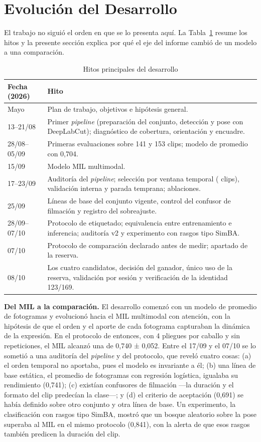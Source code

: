 \section{Evolución del Desarrollo}
El trabajo no siguió el orden en que se lo presenta aquí. La Tabla~\ref{tab:c4-hitos} resume los hitos y la presente sección explica por qué el eje del informe cambió de un modelo a una comparación.

\begin{table}[H]
\caption{Hitos principales del desarrollo}\label{tab:c4-hitos}
{\singlespacing\small
\begin{tabularx}{\textwidth}{@{}p{2.6cm}X@{}}
\toprule
Fecha (2026) & Hito \\
\midrule
Mayo & Plan de trabajo, objetivos e hipótesis general. \\
13--21/08 & Primer \textit{pipeline} (preparación del conjunto, detección y pose con DeepLabCut); diagnóstico de cobertura, orientación y encuadre. \\
28/08--05/09 & Primeras evaluaciones sobre 141 y 153 clips; modelo de promedio con \fmacro{} 0,704. \\
15/09 & Modelo MIL multimodal. \\
17--23/09 & Auditoría del \textit{pipeline}; selección por ventana temporal (\ClipsTotal{} clips), validación interna y parada temprana; ablaciones. \\
25/09 & Líneas de base del conjunto vigente, control del confusor de filmación y registro del sobreajuste. \\
28/09--07/10 & Protocolo de etiquetado; equivalencia entre entrenamiento e inferencia; auditoría v2 y experimento con rasgos tipo SimBA. \\
07/10 & Protocolo de comparación declarado antes de medir; apartado de la reserva. \\
08/10 & Los cuatro candidatos, decisión del ganador, único uso de la reserva, validación por sesión y verificación de la identidad 123/169. \\
\bottomrule
\end{tabularx}}
\end{table}

\textbf{Del MIL a la comparación.} El desarrollo comenzó con un modelo de promedio de fotogramas y evolucionó hacia el MIL multimodal con atención, con la hipótesis de que el orden y el aporte de cada fotograma capturaban la dinámica de la expresión. En el protocolo de entonces, con 4 pliegues por caballo y sin repeticiones, el MIL alcanzó una \fmacro{} de 0,740 ± 0,052. Entre el 17/09 y el 07/10 se lo sometió a una auditoría del \textit{pipeline} y del protocolo, que reveló cuatro cosas: (a) el orden temporal no aportaba, pues el modelo es invariante a él; (b) una línea de base estática, el promedio de fotogramas con regresión logística, igualaba su rendimiento (0,741); (c) existían confusores de filmación ---la duración y el formato del clip predecían la clase---; y (d) el criterio de aceptación (0,691) se había definido sobre otro conjunto y otra línea de base. Un experimento, la clasificación con rasgos tipo SimBA, mostró que un bosque aleatorio sobre la pose superaba al MIL en el mismo protocolo (0,841), con la alerta de que esos rasgos también predicen la duración del clip.


